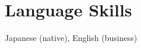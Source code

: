 \documentclass[letterpaper,11pt]{article}
\begin{document}
\section{Language Skills}
 \begin{itemize}[leftmargin=0.15in, label={}]
    \small{\item{Japanese (native), English (business)}}
 \end{itemize}

\end{document}

